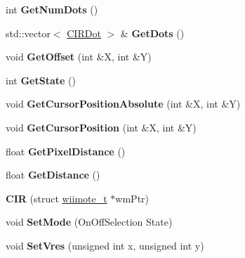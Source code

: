 \begin{DoxyCompactItemize}
\item 
\hypertarget{class_c_i_r_a76afd635873b098e0cd6c8b9bcab9587}{int {\bfseries Get\-Num\-Dots} ()}\label{class_c_i_r_a76afd635873b098e0cd6c8b9bcab9587}

\item 
\hypertarget{class_c_i_r_a696847a5468daceba452bbd152f0e853}{std\-::vector$<$ \hyperlink{class_c_i_r_dot}{C\-I\-R\-Dot} $>$ \& {\bfseries Get\-Dots} ()}\label{class_c_i_r_a696847a5468daceba452bbd152f0e853}

\item 
\hypertarget{class_c_i_r_aeb23613d64e95e7e7fff717c83f68377}{void {\bfseries Get\-Offset} (int \&X, int \&Y)}\label{class_c_i_r_aeb23613d64e95e7e7fff717c83f68377}

\item 
\hypertarget{class_c_i_r_aee4bc6e44ee5903b2c45cc46bf5be361}{int {\bfseries Get\-State} ()}\label{class_c_i_r_aee4bc6e44ee5903b2c45cc46bf5be361}

\item 
\hypertarget{class_c_i_r_a573324907a9082fe70d65b419ed83a5e}{void {\bfseries Get\-Cursor\-Position\-Absolute} (int \&X, int \&Y)}\label{class_c_i_r_a573324907a9082fe70d65b419ed83a5e}

\item 
\hypertarget{class_c_i_r_a8b37d7fa74319ff3736cf39956f82df0}{void {\bfseries Get\-Cursor\-Position} (int \&X, int \&Y)}\label{class_c_i_r_a8b37d7fa74319ff3736cf39956f82df0}

\item 
\hypertarget{class_c_i_r_a254b766dbc50c29d5d08ae8375e764f8}{float {\bfseries Get\-Pixel\-Distance} ()}\label{class_c_i_r_a254b766dbc50c29d5d08ae8375e764f8}

\item 
\hypertarget{class_c_i_r_aa9d59cb470867a28b558f310b154fcc2}{float {\bfseries Get\-Distance} ()}\label{class_c_i_r_aa9d59cb470867a28b558f310b154fcc2}

\item 
\hypertarget{class_c_i_r_aa57f492413ae0ab3b89df2132333c8aa}{{\bfseries C\-I\-R} (struct \hyperlink{structwiimote__t}{wiimote\-\_\-t} $\ast$wm\-Ptr)}\label{class_c_i_r_aa57f492413ae0ab3b89df2132333c8aa}

\item 
\hypertarget{class_c_i_r_a4c5e1930758120afa38ce8f4404c0cad}{void {\bfseries Set\-Mode} (On\-Off\-Selection State)}\label{class_c_i_r_a4c5e1930758120afa38ce8f4404c0cad}

\item 
\hypertarget{class_c_i_r_a55843dbe557db2a246b72a820d4feb2f}{void {\bfseries Set\-Vres} (unsigned int x, unsigned int y)}\label{class_c_i_r_a55843dbe557db2a246b72a820d4feb2f}


\end{DoxyCompactItemize}
